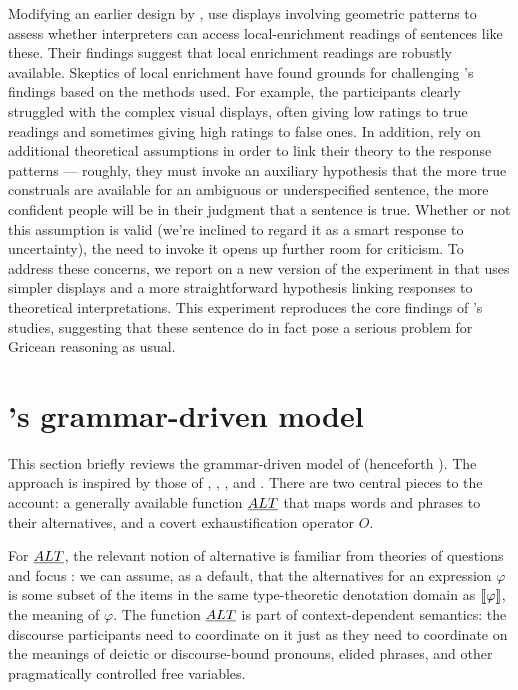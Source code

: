 \documentclass[leqno]{article}
\begin{document}
Modifying an earlier design by \citet{Geurts:Pouscoulous:2009},
\citeauthor{Chemla:Spector:2011} use displays involving geometric
patterns to assess whether interpreters can access local-enrichment
readings of sentences like these. Their findings suggest that local
enrichment readings are robustly available. Skeptics of local
enrichment have found grounds for challenging
\citeauthor{Chemla:Spector:2011}'s findings based on the methods
used. For example, the participants clearly struggled with the complex
visual displays, often giving low ratings to true readings and
sometimes giving high ratings to false ones. In addition,
\citeauthor{Chemla:Spector:2011} rely on additional theoretical
assumptions in order to link their theory to the response patterns ---
roughly, they must invoke an auxiliary hypothesis that the more true
construals are available for an ambiguous or underspecified sentence,
the more confident people will be in their judgment that a sentence is
true. Whether or not this assumption is valid (we're inclined to
regard it as a smart response to uncertainty), the need to invoke it
opens up further room for criticism. To address these concerns, we
report on a new version of the experiment in  that
uses simpler displays and a more straightforward hypothesis linking
responses to theoretical interpretations. This experiment reproduces
the core findings of \citeauthor{Chemla:Spector:2011}'s studies,
suggesting that these sentence do in fact pose a serious problem for
Gricean reasoning as usual.


\section{\CFS's grammar-driven model}\label{sec:cfs}

This section briefly reviews the grammar-driven model of
\citet{ChierchiaFoxSpector08} (henceforth \CFS).  The approach is
inspired by those of \citet{Chierchia01}, \citet{Sauerland01},
\citet{Spector:2007}, and \citet{Fox:2007,Fox:2009}. There are two
central pieces to the account: a generally available function $\emph{ALT}$
that maps words and phrases to their alternatives, and a covert
exhaustification operator $O$.

For $\emph{ALT}$, the relevant notion of alternative is familiar from
theories of questions and focus \citep{Groenendijk84,Rooth85,Rooth92}:
we can assume, as a default, that the alternatives for an expression
$\varphi$ is some subset of the items in the same type-theoretic
denotation domain as $\llbracket\varphi\rrbracket$, the meaning of $\varphi$.  The
function $\emph{ALT}$ is part of context-dependent semantics: the discourse
participants need to coordinate on it just as they need to coordinate
on the meanings of deictic or discourse-bound pronouns, elided
phrases, and other pragmatically controlled free variables.
\end{document}
